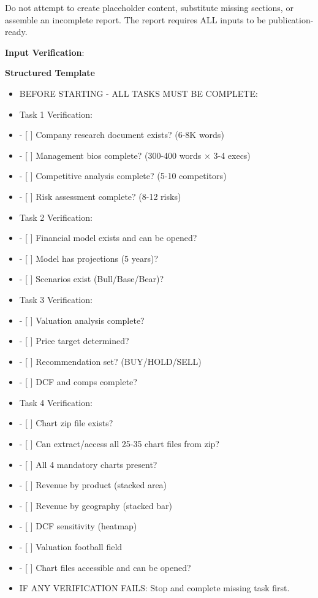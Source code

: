 \documentclass[11pt]{article}
\begin{document}
Do not attempt to create placeholder content, substitute missing sections, or assemble an incomplete report. The report requires ALL inputs to be publication-ready.


\textbf{Input Verification}:

\textbf{Structured Template}
\begin{itemize}[leftmargin=*,itemsep=2pt,topsep=2pt]
\item {} BEFORE STARTING - ALL TASKS MUST BE COMPLETE:
\item {} Task 1 Verification:
\item {} - [ ] Company research document exists? (6-8K words)
\item {} - [ ] Management bios complete? (300-400 words × 3-4 execs)
\item {} - [ ] Competitive analysis complete? (5-10 competitors)
\item {} - [ ] Risk assessment complete? (8-12 risks)
\item {} Task 2 Verification:
\item {} - [ ] Financial model exists and can be opened?
\item {} - [ ] Model has projections (5 years)?
\item {} - [ ] Scenarios exist (Bull/Base/Bear)?
\item {} Task 3 Verification:
\item {} - [ ] Valuation analysis complete?
\item {} - [ ] Price target determined?
\item {} - [ ] Recommendation set? (BUY/HOLD/SELL)
\item {} - [ ] DCF and comps complete?
\item {} Task 4 Verification:
\item {} - [ ] Chart zip file exists?
\item {} - [ ] Can extract/access all 25-35 chart files from zip?
\item {} - [ ] All 4 mandatory charts present?
\item {} - [ ] Revenue by product (stacked area)
\item {} - [ ] Revenue by geography (stacked bar)
\item {} - [ ] DCF sensitivity (heatmap)
\item {} - [ ] Valuation football field
\item {} - [ ] Chart files accessible and can be opened?
\item {} IF ANY VERIFICATION FAILS: Stop and complete missing task first.
\end{itemize}
\end{document}
